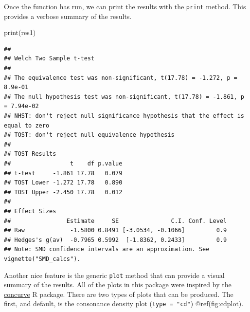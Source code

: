 \documentclass[]{interact}
\theoremstyle{plain}%
\theoremstyle{definition}
\theoremstyle{remark}
\newenvironment{Shaded}{\begin{snugshade}}{\end{snugshade}}
\newcommand{\AttributeTok}[1]{\textcolor[rgb]{0.77,0.63,0.00}{#1}}
\newcommand{\CommentTok}[1]{\textcolor[rgb]{0.56,0.35,0.01}{\textit{#1}}}
\newcommand{\DecValTok}[1]{\textcolor[rgb]{0.00,0.00,0.81}{#1}}
\newcommand{\FunctionTok}[1]{\textcolor[rgb]{0.00,0.00,0.00}{#1}}
\newcommand{\NormalTok}[1]{#1}
\newcommand{\OtherTok}[1]{\textcolor[rgb]{0.56,0.35,0.01}{#1}}
\newcommand{\SpecialCharTok}[1]{\textcolor[rgb]{0.00,0.00,0.00}{#1}}
\newcommand{\StringTok}[1]{\textcolor[rgb]{0.31,0.60,0.02}{#1}}
\begin{document}
\begin{Shaded}
\end{Shaded}

\newpage

Once the function has run, we can print the results with the
\texttt{print} method. This provides a verbose summary of the results.

\begin{Shaded}
\begin{Highlighting}[]
\FunctionTok{print}\NormalTok{(res1)}
\end{Highlighting}
\end{Shaded}

\begin{verbatim}
## 
## Welch Two Sample t-test
## 
## The equivalence test was non-significant, t(17.78) = -1.272, p = 8.9e-01
## The null hypothesis test was non-significant, t(17.78) = -1.861, p = 7.94e-02
## NHST: don't reject null significance hypothesis that the effect is equal to zero 
## TOST: don't reject null equivalence hypothesis
## 
## TOST Results 
##                 t    df p.value
## t-test     -1.861 17.78   0.079
## TOST Lower -1.272 17.78   0.890
## TOST Upper -2.450 17.78   0.012
## 
## Effect Sizes 
##                Estimate     SE               C.I. Conf. Level
## Raw             -1.5800 0.8491 [-3.0534, -0.1066]         0.9
## Hedges's g(av)  -0.7965 0.5992  [-1.8362, 0.2433]         0.9
## Note: SMD confidence intervals are an approximation. See vignette("SMD_calcs").
\end{verbatim}

Another nice feature is the generic \texttt{plot} method that can
provide a visual summary of the results. All of the plots in this
package were inspired by the
\href{https://cran.r-project.org/package=concurve}{concurve} R package.
There are two types of plots that can be produced. The first, and
default, is the consonance density plot (\texttt{type\ =\ "cd"})
@ref(fig:cdplot).
\end{document}
